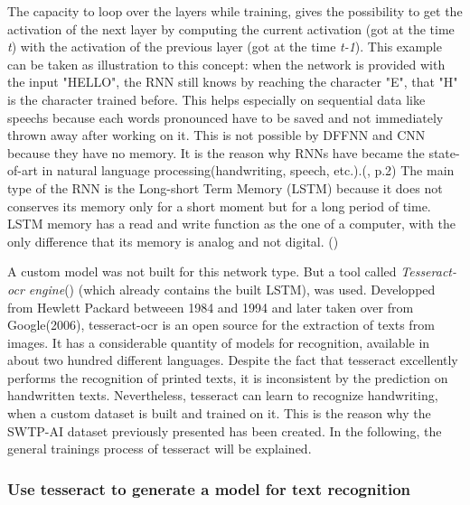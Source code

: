 \noindent
The capacity to loop over the layers while training, gives the possibility to get the activation of the next layer 
by computing the current activation (got at the time \emph{t}) with the activation of the previous 
layer (got at the time \emph{t-1}).
This example can be taken as illustration to this concept: when the network is provided with the input "HELLO", the RNN still knows 
by reaching the character "E", that "H" is the character trained before.
This helps especially on sequential data like speechs because each words pronounced have to be saved and not 
immediately thrown away after working on it.
This is not possible by DFFNN and CNN because they have no memory. It is the reason why RNNs have became the state-of-art in natural 
language processing(handwriting, speech, etc.).(\cite{[6]}, p.2)
The main type of the RNN is the Long-short Term Memory (LSTM) because it does not conserves its memory only for a 
short moment but for a long period of time. 
LSTM memory has a read and write function as the one of a computer, with the only difference that 
its memory is analog and not digital. (\cite{[7]})

\noindent
A custom model was not built for this network type. But a tool called \emph{Tesseract-ocr engine}(\cite{[11]}) (which already contains 
the built LSTM), was used. 
Developped from Hewlett Packard betweeen 1984 and 1994 and later taken over from Google(2006), tesseract-ocr 
is an open source for the extraction of texts from images. 
It has a considerable quantity of models for recognition, available in about two hundred different languages. 
Despite the fact that tesseract excellently performs the recognition of printed texts, it is inconsistent by the 
prediction on handwritten texts. 
Nevertheless, tesseract can learn to recognize handwriting, when a custom dataset is built and trained on it. 
This is the reason why the SWTP-AI dataset previously presented has been created.
In the following, the general trainings process of tesseract will be explained.

\subsubsection{Use tesseract to generate a model for text recognition}

